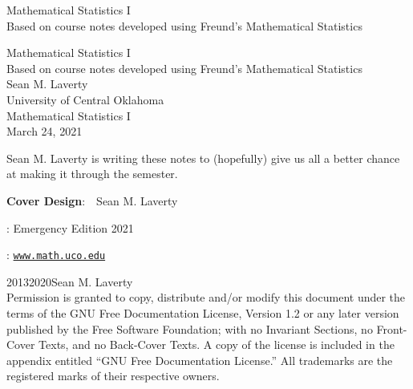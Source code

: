 \documentclass[oneside,10pt,]{book}
\newcommand{\titlepagefont}{\relax}
\newcommand{\mono}[1]{\texttt{#1}}
\numberwithin{equation}{section}
\begin{document}
\frontmatter
\setcounter{page}{0}%
%
\thispagestyle{empty}
{\titlepagefont\centering
\vspace*{0.28\textheight}
{\Huge Mathematical Statistics I}\\[2\baselineskip]
{\LARGE Based on course notes developed using Freund's Mathematical Statistics}\\
}
\clearpage
\thispagestyle{empty}
\null%
\clearpage
\thispagestyle{empty}
{\titlepagefont\centering
\vspace*{0.14\textheight}
{\Huge Mathematical Statistics I}\\[\baselineskip]
{\LARGE Based on course notes developed using Freund's Mathematical Statistics}\\[3\baselineskip]
{\Large Sean M. Laverty}\\[0.5\baselineskip]
{\Large University of Central Oklahoma}\\[3\baselineskip]
{\Large Mathematical Statistics I}\\[0.5\baselineskip]
{\Large March 24, 2021}\\}
\clearpage
\thispagestyle{empty}
\hypertarget{x:colophon:front-colophon}{}\noindent
Sean M. Laverty is writing these notes to (hopefully) give us all a better chance at making it through the semester.%
\par
{}
\par\noindent
\textbf{Cover Design}:\ \ Sean M. Laverty
\par{}
: Emergency Edition 2021\par\medskip
{}: \href{http:\slash{}\slash{}www.math.uco.edu}{\mono{www.math.uco.edu}}\par\medskip
\noindent\textcopyright{}2013\textendash{}2020\quad{}Sean M. Laverty\\[0.5\baselineskip]
Permission is granted to copy, distribute and\slash{}or modify this document under the terms of the GNU Free Documentation License, Version 1.2 or any later version published by the Free Software Foundation; with no Invariant Sections, no Front-Cover Texts, and no Back-Cover Texts.  A copy of the license is included in the appendix entitled ``GNU Free Documentation License.''  All trademarks\texttrademark{} are the registered\textregistered{} marks of their respective owners.\par\medskip
\end{document}
